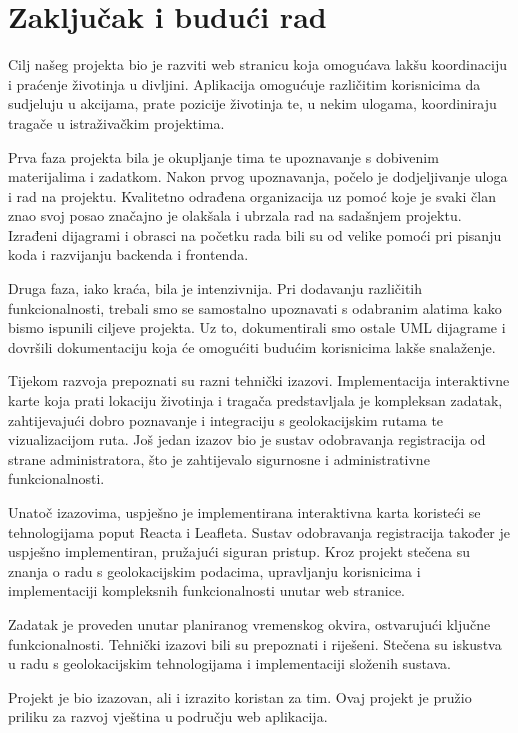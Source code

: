 \begin{flushleft}
	
\end{flushleft}\chapter{Zaključak i budući rad}
		
		Cilj našeg projekta bio je razviti web stranicu koja omogućava lakšu koordinaciju i praćenje životinja u divljini. Aplikacija omogućuje različitim korisnicima da sudjeluju u akcijama, prate pozicije životinja te, u nekim ulogama, koordiniraju tragače u istraživačkim projektima.

Prva faza projekta bila je okupljanje tima te upoznavanje s dobivenim materijalima i zadatkom. Nakon prvog upoznavanja, počelo je dodjeljivanje uloga i rad na projektu. Kvalitetno odrađena organizacija uz pomoć koje je svaki član znao svoj posao značajno je olakšala i ubrzala rad na sadašnjem projektu. Izrađeni dijagrami i obrasci na početku rada bili su od velike pomoći pri pisanju koda i razvijanju backenda i frontenda.

Druga faza, iako kraća, bila je intenzivnija. Pri dodavanju različitih funkcionalnosti, trebali smo se samostalno upoznavati s odabranim alatima kako bismo ispunili ciljeve projekta. Uz to, dokumentirali smo ostale UML dijagrame i dovršili dokumentaciju koja će omogućiti budućim korisnicima lakše snalaženje.

Tijekom razvoja prepoznati su razni tehnički izazovi. Implementacija interaktivne karte koja prati lokaciju životinja i tragača predstavljala je kompleksan zadatak, zahtijevajući dobro poznavanje i integraciju s geolokacijskim rutama te vizualizacijom ruta. Još jedan izazov bio je sustav odobravanja registracija od strane administratora, što je zahtijevalo sigurnosne i administrativne funkcionalnosti.

Unatoč izazovima, uspješno je implementirana interaktivna karta koristeći se tehnologijama poput Reacta i Leafleta. Sustav odobravanja registracija također je uspješno implementiran, pružajući siguran pristup. Kroz projekt stečena su znanja o radu s geolokacijskim podacima, upravljanju korisnicima i implementaciji kompleksnih funkcionalnosti unutar web stranice.

Zadatak je proveden unutar planiranog vremenskog okvira, ostvarujući ključne funkcionalnosti. Tehnički izazovi bili su prepoznati i riješeni. Stečena su iskustva u radu s geolokacijskim tehnologijama i implementaciji složenih sustava.

Projekt je bio izazovan, ali i izrazito koristan za tim. Ovaj projekt je pružio priliku za razvoj vještina u području web aplikacija.
		
		
		
		\eject 